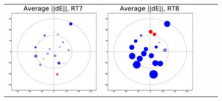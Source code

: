 \documentclass[]{article}
\begin{document}
\begin{figure}
\begin{tabular}{@{}c@{}c@{}c@{}c@{}c@{}}
\includegraphics[width=\roguewidth]{qmc2b_dE_ant7} &
\includegraphics[width=\roguewidth]{qmc2b_dE_ant8} &

\end{tabular}
\end{figure}
\end{document}
